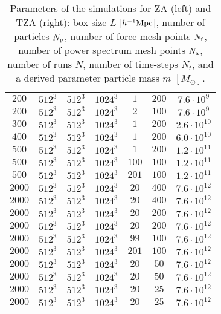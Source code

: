 \begin{table}
{\begin{tabular}{ ccccccc }
    $200$ & $512^3$ & $512^3$ & $1024^3$ & $1$ & $200$ & $7.6\cdot10^{9}$\\
    $200$ & $512^3$ & $512^3$ & $1024^3$ & $2$ & $100$ & $7.6\cdot10^{9}$\\
    $300$ & $512^3$ & $512^3$ & $1024^3$ & $1$ & $200$ & $2.6\cdot10^{10}$\\
    $400$ & $512^3$ & $512^3$ & $1024^3$ & $1$ & $200$ & $6.0\cdot10^{10}$\\
    $500$ & $512^3$ & $512^3$ & $1024^3$ & $1$ & $200$ & $1.2\cdot10^{11}$\\
    $500$ & $512^3$ & $512^3$ & $1024^3$ & $100$ & $100$ & $1.2\cdot10^{11}$\\
    $500$ & $512^3$ & $512^3$ & $1024^3$ & $201$ & $100$ & $1.2\cdot10^{11}$\\
    $2000$ & $512^3$ & $512^3$ & $1024^3$ & $20$ & $400$ & $7.6\cdot10^{12}$\\
    $2000$ & $512^3$ & $512^3$ & $1024^3$ & $20$ & $400$ & $7.6\cdot10^{12}$\\
    $2000$ & $512^3$ & $512^3$ & $1024^3$ & $20$ & $200$ & $7.6\cdot10^{12}$\\
    $2000$ & $512^3$ & $512^3$ & $1024^3$ & $20$ & $200$ & $7.6\cdot10^{12}$\\
    $2000$ & $512^3$ & $512^3$ & $1024^3$ & $99$ & $100$ & $7.6\cdot10^{12}$\\
    $2000$ & $512^3$ & $512^3$ & $1024^3$ & $201$ & $100$ & $7.6\cdot10^{12}$\\
    $2000$ & $512^3$ & $512^3$ & $1024^3$ & $20$ & $50$ & $7.6\cdot10^{12}$\\
    $2000$ & $512^3$ & $512^3$ & $1024^3$ & $20$ & $50$ & $7.6\cdot10^{12}$\\
    $2000$ & $512^3$ & $512^3$ & $1024^3$ & $20$ & $25$ & $7.6\cdot10^{12}$\\
    $2000$ & $512^3$ & $512^3$ & $1024^3$ & $20$ & $25$ & $7.6\cdot10^{12}$\\
    \hline
    \end{tabular}
    }
    \caption{Parameters of the simulations for ZA (left) and TZA (right): box size $L$ [$h^{-1}\text{Mpc}$], number of particles $N_{\rm p}$, number of force mesh points $N_{\rm f}$, number of power spectrum mesh points $N_{\rm a}$, number of runs $N$, number of time-steps $N_t$, and a derived parameter particle mass $m$ $[M_\odot]$.}
    \label{tab:sim_param_ZA_TZA}
    \end{table}
    

